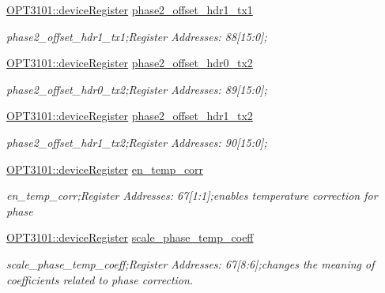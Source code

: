 \begin{DoxyCompactItemize}
\mbox{\hyperlink{class_o_p_t3101_1_1device_register}{O\+P\+T3101\+::device\+Register}} \mbox{\hyperlink{class_o_p_t3101_1_1registers_a4b97d39be310c02495db73d06e5aa58a}{phase2\+\_\+offset\+\_\+hdr1\+\_\+tx1}}
\begin{DoxyCompactList}\small\item\em phase2\+\_\+offset\+\_\+hdr1\+\_\+tx1;Register Addresses\+: 88\mbox{[}15\+:0\mbox{]}; \end{DoxyCompactList}\item 
\mbox{\hyperlink{class_o_p_t3101_1_1device_register}{O\+P\+T3101\+::device\+Register}} \mbox{\hyperlink{class_o_p_t3101_1_1registers_a2933b108b9d6edf0dfdc94da6d65afb1}{phase2\+\_\+offset\+\_\+hdr0\+\_\+tx2}}
\begin{DoxyCompactList}\small\item\em phase2\+\_\+offset\+\_\+hdr0\+\_\+tx2;Register Addresses\+: 89\mbox{[}15\+:0\mbox{]}; \end{DoxyCompactList}\item 
\mbox{\hyperlink{class_o_p_t3101_1_1device_register}{O\+P\+T3101\+::device\+Register}} \mbox{\hyperlink{class_o_p_t3101_1_1registers_a98c752b2fc2d618901f4ae877539847b}{phase2\+\_\+offset\+\_\+hdr1\+\_\+tx2}}
\begin{DoxyCompactList}\small\item\em phase2\+\_\+offset\+\_\+hdr1\+\_\+tx2;Register Addresses\+: 90\mbox{[}15\+:0\mbox{]}; \end{DoxyCompactList}\item 
\mbox{\hyperlink{class_o_p_t3101_1_1device_register}{O\+P\+T3101\+::device\+Register}} \mbox{\hyperlink{class_o_p_t3101_1_1registers_aa14680f50f347cb771067cd833720963}{en\+\_\+temp\+\_\+corr}}
\begin{DoxyCompactList}\small\item\em en\+\_\+temp\+\_\+corr;Register Addresses\+: 67\mbox{[}1\+:1\mbox{]};enables temperature correction for phase \end{DoxyCompactList}\item 
\mbox{\hyperlink{class_o_p_t3101_1_1device_register}{O\+P\+T3101\+::device\+Register}} \mbox{\hyperlink{class_o_p_t3101_1_1registers_a0e1ab2b8fda7b67d1d83606b2a5af70f}{scale\+\_\+phase\+\_\+temp\+\_\+coeff}}
\begin{DoxyCompactList}\small\item\em scale\+\_\+phase\+\_\+temp\+\_\+coeff;Register Addresses\+: 67\mbox{[}8\+:6\mbox{]};changes the meaning of coefficients related to phase correction. \end{DoxyCompactList}\item 

\end{DoxyCompactItemize}
